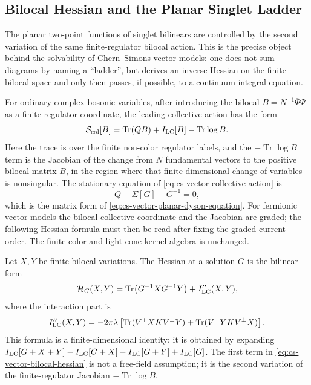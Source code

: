 \subsection{Bilocal Hessian and the Planar Singlet Ladder}

The planar two-point functions of singlet bilinears are controlled by the
second variation of the same finite-regulator bilocal action.  This is the
precise object behind the solvability of Chern--Simons vector models: one
does not sum diagrams by naming a ``ladder'', but derives an inverse Hessian
on the finite bilocal space and only then passes, if possible, to a continuum
integral equation.

For ordinary complex bosonic variables, after introducing the bilocal
\(B=N^{-1}\overline\Psi\Psi\) as a finite-regulator coordinate, the leading
collective action has the form
\begin{equation}
  \mathcal S_{\rm col}[B]
  =
  \operatorname{Tr}(QB)
  +I_{\rm LC}[B]
  -\operatorname{Tr}\log B .
  \label{eq:cs-vector-collective-action}
\end{equation}
Here the trace is over the finite non-color regulator labels, and the
\(-\operatorname{Tr}\log B\) term is the Jacobian of the change from \(N\)
fundamental vectors to the positive bilocal matrix \(B\), in the region where
that finite-dimensional change of variables is nonsingular.  The stationary
equation of \eqref{eq:cs-vector-collective-action} is
\[
  Q+\Sigma[G]-G^{-1}=0,
\]
which is the matrix form of
\eqref{eq:cs-vector-planar-dyson-equation}.  For fermionic vector models the
bilocal collective coordinate and the Jacobian are graded; the following
Hessian formula must then be read after fixing the graded current order.  The
finite color and light-cone kernel algebra is unchanged.

Let \(X,Y\) be finite bilocal variations.  The Hessian at a solution \(G\)
is the bilinear form
\begin{equation}
  \mathcal H_G(X,Y)
  =
  \operatorname{Tr}\!\left(G^{-1}XG^{-1}Y\right)
  +I_{\rm LC}''(X,Y),
  \label{eq:cs-vector-bilocal-hessian}
\end{equation}
where the interaction part is
\begin{equation}
  I_{\rm LC}''(X,Y)
  =
  -2\pi\lambda
  \left[
  \operatorname{Tr}(V^+XKV^\perp Y)
  +
  \operatorname{Tr}(V^+YKV^\perp X)
  \right].
  \label{eq:cs-vector-bilocal-hessian-interaction}
\end{equation}
This formula is a finite-dimensional identity: it is obtained by expanding
\(I_{\rm LC}[G+X+Y]-I_{\rm LC}[G+X]-I_{\rm LC}[G+Y]+I_{\rm LC}[G]\).
The first term in \eqref{eq:cs-vector-bilocal-hessian} is not a free-field
assumption; it is the second variation of the finite-regulator Jacobian
\(-\operatorname{Tr}\log B\).

